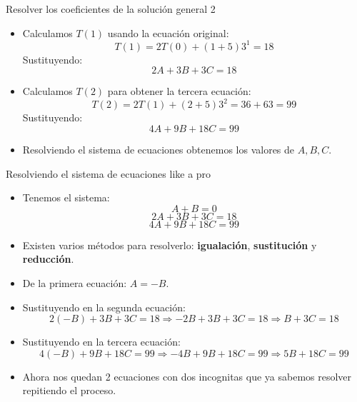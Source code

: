 \documentclass[aspectratio=169]{beamer}
\begin{document}
\begin{frame}{Resolver los coeficientes de la solución general 2}
\begin{itemize}
 \item Calculamos \( T(1) \) usando la ecuación original:
    \[
    T(1) = 2T(0) + (1+5)3^1 = 18
    \]
    Sustituyendo:
    \[
    2A + 3B + 3C = 18
    \]
    
    \item Calculamos \( T(2) \) para obtener la tercera ecuación:
    \[
    T(2) = 2T(1) + (2+5)3^2 = 36 + 63 = 99
    \]
    Sustituyendo:
    \[
    4A + 9B + 18C = 99
    \]
    
    \item Resolviendo el sistema de ecuaciones obtenemos los valores de \( A, B, C \).
\end{itemize}
\end{frame}

\begin{frame}{Resolviendo el sistema de ecuaciones like a pro}
\begin{itemize}
    \item Tenemos el sistema:
    \[
    A + B = 0
    \]
    \[
    2A + 3B + 3C = 18
    \]
    \[
    4A + 9B + 18C = 99
    \]
    
    \item Existen varios métodos para resolverlo: \textbf{igualación}, \textbf{sustitución} y \textbf{reducción}.
    
    \item De la primera ecuación: \( A = -B \).
    
    \item Sustituyendo en la segunda ecuación:
    \[
    2(-B) + 3B + 3C = 18 \Rightarrow -2B + 3B + 3C = 18 \Rightarrow B + 3C = 18
    \]
    
    \item Sustituyendo en la tercera ecuación:
    \[
    4(-B) + 9B + 18C = 99 \Rightarrow -4B + 9B + 18C = 99 \Rightarrow 5B + 18C = 99
    \]
    
    \item Ahora nos quedan 2 ecuaciones con dos incognitas que ya sabemos resolver repitiendo el proceso.
\end{itemize}
\end{frame}
\end{document}
